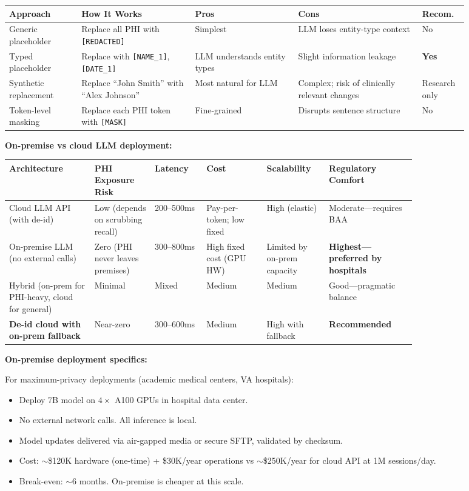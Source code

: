 \begin{tabular}{|p{0.14\linewidth}|p{0.22\linewidth}|p{0.2\linewidth}|p{0.24\linewidth}|p{0.08\linewidth}|}
\hline
\textbf{Approach} & \textbf{How It Works} & \textbf{Pros} & \textbf{Cons} & \textbf{Recom.} \\
\hline
Generic placeholder & Replace all PHI with \texttt{[REDACTED]} & Simplest & LLM loses entity-type context & No \\
\hline
Typed placeholder & Replace with \texttt{[NAME\_1]}, \texttt{[DATE\_1]} & LLM understands entity types & Slight information leakage & \textbf{Yes} \\
\hline
Synthetic replacement & Replace ``John Smith'' with ``Alex Johnson'' & Most natural for LLM & Complex; risk of clinically relevant changes & Research only \\
\hline
Token-level masking & Replace each PHI token with \texttt{[MASK]} & Fine-grained & Disrupts sentence structure & No \\
\hline
\end{tabular}

\bigskip
\textbf{On-premise vs cloud LLM deployment:}

{\small
\begin{tabular}{|p{0.17\linewidth}|p{0.12\linewidth}|p{0.1\linewidth}|p{0.12\linewidth}|p{0.1\linewidth}|p{0.17\linewidth}|}
\hline
\textbf{Architecture} & \textbf{PHI Exposure Risk} & \textbf{Latency} & \textbf{Cost} & \textbf{Scalability} & \textbf{Regulatory Comfort} \\
\hline
Cloud LLM API (with de-id) & Low (depends on scrubbing recall) & 200--500ms & Pay-per-token; low fixed & High (elastic) & Moderate---requires BAA \\
\hline
On-premise LLM (no external calls) & Zero (PHI never leaves premises) & 300--800ms & High fixed cost (GPU HW) & Limited by on-prem capacity & \textbf{Highest---preferred by hospitals} \\
\hline
Hybrid (on-prem for PHI-heavy, cloud for general) & Minimal & Mixed & Medium & Medium & Good---pragmatic balance \\
\hline
\textbf{De-id cloud with on-prem fallback} & Near-zero & 300--600ms & Medium & High with fallback & \textbf{Recommended} \\
\hline
\end{tabular}
}

\bigskip
\textbf{On-premise deployment specifics:}

For maximum-privacy deployments (academic medical centers, VA hospitals):
\begin{itemize}
  \item Deploy 7B model on $4\times$ A100 GPUs in hospital data center.
  \item No external network calls. All inference is local.
  \item Model updates delivered via air-gapped media or secure SFTP, validated by checksum.
  \item Cost: $\sim$\$120K hardware (one-time) + \$30K/year operations vs $\sim$\$250K/year for cloud API at 1M sessions/day.
  \item Break-even: $\sim$6 months. On-premise is cheaper at this scale.
\end{itemize}


